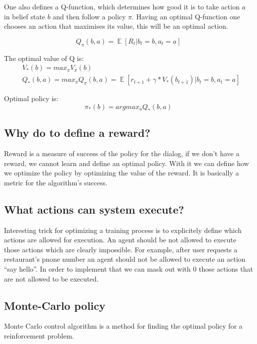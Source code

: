 \documentclass[12pt,titlepage,a4paper]{article}
\DeclareMathOperator*{\E}{\mathbb{E}}
\begin{document}
One also defines a Q-function, which determines how good it is to take action $a$ in belief state $b$ and then follow a policy $\pi$. Having an optimal Q-function one chooses an action that maximises its value, this will be an optimal action.


\begin{equation}
    Q_{\pi}(b, a) = \E[R_t| b_t = b, a_t = a]
\end{equation}

The optimal value of Q is:
\begin{align}
    &V_{*}(b) = max_{\pi}V_{\pi}(b) \\
    &Q_{*}(b, a) = max_{\pi}Q_{\pi}(b, a) = \E[r_{t+1} + \gamma * V_{*}(b_{t+1})| b_t = b, a_t = a]
\end{align}

Optimal policy is: 
\begin{equation}
    \pi_{*}(b) = argmax_{a} Q_{*}(b, a)
\end{equation}


\subsection{Why do to define a reward?}

Reward is a measure of success of the policy for the dialog, if we don’t have a reward, we cannot learn and define an optimal policy. With it we can define how we optimize the policy by optimizing the value of the reward. It is basically a metric for the algorithm's success.

\subsection{What actions can system execute?}

Interesting trick for optimizing a training process is to explicitely define which actions are allowed for execution. An agent should be not allowed to execute those actions which are clearly impossible. For example, after user requests a restaurant's pnone number an agent should not be allowed to execute an action “say hello”. In order to implement that we can mask out with 0 those actions that are not allowed to be executed.

\subsection{Monte-Carlo policy}

Monte Carlo control algorithm is a method for finding the optimal policy for a reinforcement problem.
\end{document}

